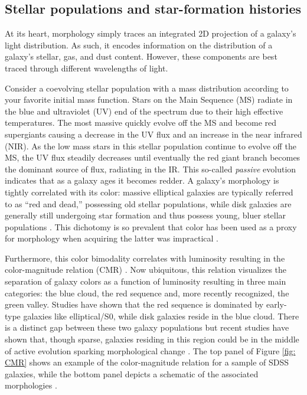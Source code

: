 \subsection{Stellar populations and star-formation histories}
At its heart, morphology simply traces an integrated 2D projection of a galaxy's light distribution. As such, it encodes information on the distribution of a galaxy's stellar, gas, and dust content. However, these components are best traced through different wavelengths of light. 

Consider a coevolving stellar population with a mass distribution according to your favorite initial mass function. Stars on the Main Sequence (MS) radiate in the blue and ultraviolet (UV) end of the spectrum due to their high effective temperatures. The most massive quickly evolve off the MS and become red supergiants causing a decrease in the UV flux and an increase in the near infrared (NIR). As the low mass stars in this stellar population continue to evolve off the MS, the UV flux steadily decreases until eventually the red giant branch becomes the dominant source of flux, radiating in the IR. This so-called \textit{passive} evolution indicates that as a galaxy ages it becomes redder. A galaxy's morphology is tightly correlated with its color: massive elliptical galaxies are typically referred to as ``red and dead,'' possessing old stellar populations, while disk galaxies are generally still undergoing star formation and thus possess young, bluer stellar populations \citep[e.g.,][]{Strateva2001,Baldry2004b, Cirasuolo2007, Lee2013, Taylor2015}. This dichotomy is so prevalent that color has been used as a proxy for morphology when acquiring the latter was impractical \citep[e.g.,][]{Shen2003, Blanton2003c}. 

Furthermore, this color bimodality correlates with luminosity resulting in the color-magnitude relation (CMR) \citep{Baldry2004a, Bell2004}. Now ubiquitous, this relation visualizes the separation of galaxy colors as a function of luminosity resulting in three main categories: the blue cloud, the red sequence and, more recently recognized, the green valley. Studies have shown that the red sequence is dominated by early-type galaxies like elliptical/S0, while disk galaxies reside in the blue cloud. There is a distinct gap between these two galaxy populations but recent studies have shown that, though sparse, galaxies residing in this region could be in the middle of active evolution sparking morphological change \citep{Schawinski2007}. The top panel of Figure \ref{fig: CMR} shows an example of the color-magnitude relation for a sample of SDSS galaxies, while the bottom panel depicts a schematic of the associated morphologies \citep{Kormendy2012}. 

